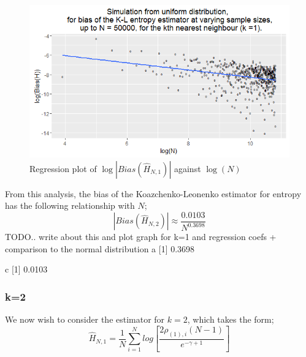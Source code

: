 \documentclass{article}
\begin{document}
\begin{figure}
  \begin{center}
    \includegraphics[width=\textwidth]{./Graphs/Uniform_k=1_plot.png}
  \end{center}
\caption{Regression plot of $\log|Bias(\hat{H}_{N, 1})|$ against $\log(N)$}
  \label{uniform_k=1_graph}
\end{figure}

 From this analysis, the bias of the Koazchenko-Leonenko estimator for entropy has the following relationship with $N$;
\begin{equation}
|Bias(\hat{H}_{N, 2})| \approx \frac{0.0103}{N^{0.3698}}\nonumber
\end{equation}
TODO.. write about this and plot graph for k=1 and regression coefs + comparison to the normal distribution
a
[1] 0.3698

c
[1] 0.0103





\subsubsection{k=2} \label{U_k=2}
We now wish to consider the estimator for $k=2$, which takes the form;
\begin{equation} 
\hat{H}_{N, 1} = \frac{1}{N} \sum_{i=1}^{N} log \left[ \frac{2\rho_{(1),i} (N-1)}{e^{-\gamma + 1}} \right] \nonumber
\end{equation}
\end{document}
